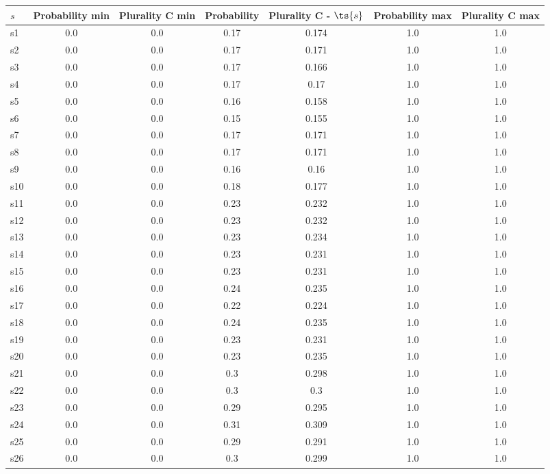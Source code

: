 \documentclass{article}
\begin{document}
\noindent\begin{tabular}{|l|c|c|c|c|c|c|}
\hline
$s$& Probability min & Plurality C min & Probability & Plurality C - $\ts{s}$ & Probability max & Plurality C max\\
\hline
s1 &0.0 & 0.0 & 0.17 & 0.174 & 1.0 & 1.0\\
\hline
s2 &0.0 & 0.0 & 0.17 & 0.171 & 1.0 & 1.0\\
\hline
s3 &0.0 & 0.0 & 0.17 & 0.166 & 1.0 & 1.0\\
\hline
s4 &0.0 & 0.0 & 0.17 & 0.17 & 1.0 & 1.0\\
\hline
s5 &0.0 & 0.0 & 0.16 & 0.158 & 1.0 & 1.0\\
\hline
s6 &0.0 & 0.0 & 0.15 & 0.155 & 1.0 & 1.0\\
\hline
s7 &0.0 & 0.0 & 0.17 & 0.171 & 1.0 & 1.0\\
\hline
s8 &0.0 & 0.0 & 0.17 & 0.171 & 1.0 & 1.0\\
\hline
s9 &0.0 & 0.0 & 0.16 & 0.16 & 1.0 & 1.0\\
\hline
s10 &0.0 & 0.0 & 0.18 & 0.177 & 1.0 & 1.0\\
\hline
s11 &0.0 & 0.0 & 0.23 & 0.232 & 1.0 & 1.0\\
\hline
s12 &0.0 & 0.0 & 0.23 & 0.232 & 1.0 & 1.0\\
\hline
s13 &0.0 & 0.0 & 0.23 & 0.234 & 1.0 & 1.0\\
\hline
s14 &0.0 & 0.0 & 0.23 & 0.231 & 1.0 & 1.0\\
\hline
s15 &0.0 & 0.0 & 0.23 & 0.231 & 1.0 & 1.0\\
\hline
s16 &0.0 & 0.0 & 0.24 & 0.235 & 1.0 & 1.0\\
\hline
s17 &0.0 & 0.0 & 0.22 & 0.224 & 1.0 & 1.0\\
\hline
s18 &0.0 & 0.0 & 0.24 & 0.235 & 1.0 & 1.0\\
\hline
s19 &0.0 & 0.0 & 0.23 & 0.231 & 1.0 & 1.0\\
\hline
s20 &0.0 & 0.0 & 0.23 & 0.235 & 1.0 & 1.0\\
\hline
s21 &0.0 & 0.0 & 0.3 & 0.298 & 1.0 & 1.0\\
\hline
s22 &0.0 & 0.0 & 0.3 & 0.3 & 1.0 & 1.0\\
\hline
s23 &0.0 & 0.0 & 0.29 & 0.295 & 1.0 & 1.0\\
\hline
s24 &0.0 & 0.0 & 0.31 & 0.309 & 1.0 & 1.0\\
\hline
s25 &0.0 & 0.0 & 0.29 & 0.291 & 1.0 & 1.0\\
\hline
s26 &0.0 & 0.0 & 0.3 & 0.299 & 1.0 & 1.0\\
\hline

\end{tabular}
\end{document}
